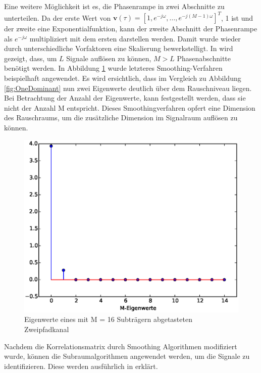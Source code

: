Eine weitere Möglichkeit ist es, die Phasenrampe in zwei Abschnitte zu unterteilen. Da der erste Wert von $\mathbf{v}(\tau) = [1, e^{-j\omega}, \ldots, e^{-j(M-1)\omega}]^T$, 1 ist und der zweite eine Exponentialfunktion, kann der zweite Abschnitt der Phasenrampe als $e^{-j\omega}$ multipliziert mit dem ersten darstellen werden. Damit wurde wieder durch unterschiedliche Vorfaktoren eine Skalierung bewerkstelligt.
In \cite{smoothing} wird gezeigt, dass, um $L$ Signale auflösen zu können, $M > L$ Phasenabschnitte benötigt werden. 
In Abbildung \ref{fig:DominantE} wurde letzteres Smoothing-Verfahren beispielhaft angewendet. Es wird ersichtlich, dass im Vergleich zu Abbildung \ref{fig:OneDominant} nun zwei Eigenwerte deutlich über dem Rauschniveau liegen. Bei Betrachtung der Anzahl der Eigenwerte, kann festgestellt werden, dass sie nicht der Anzahl M entspricht. Dieses Smoothingverfahren opfert eine Dimension des Rauschraums, um die zusätzliche Dimension im  Signalraum auflösen zu können.

\begin{figure}[htbp]
	\centering
	\includegraphics[scale=0.5]{images/DominantE}
	\caption{Eigenwerte eines mit M = 16 Subträgern abgetasteten Zweipfadkanal}
	\label{fig:DominantE}
\end{figure}

Nachdem die Korrelationsmatrix durch Smoothing Algorithmen modifiziert wurde, können die Subraumalgorithmen angewendet werden, um die Signale zu identifizieren. Diese werden ausführlich in \cite{kammeyer} erklärt. 

